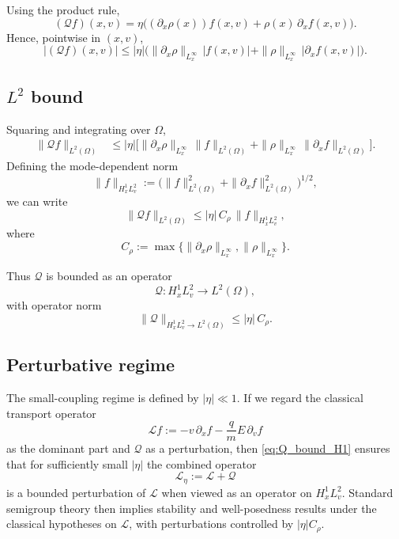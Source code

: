 \documentclass[11pt]{article}
\begin{document}
Using the product rule,
\begin{equation}
  (\mathcal{Q} f)(x,v)
  = \eta \big( (\partial_x \rho(x)) f(x,v)
              + \rho(x)\,\partial_x f(x,v)\big).
  \label{eq:Q_operator}
\end{equation}
Hence, pointwise in $(x,v)$,
\[
  |(\mathcal{Q} f)(x,v)|
  \le |\eta|\Big( \|\partial_x \rho\|_{L^\infty_x}\,|f(x,v)|
                  + \|\rho\|_{L^\infty_x}
                    \,|\partial_x f(x,v)|\Big).
\]

\subsection{$L^2$ bound}

Squaring and integrating over $\Omega$,
\begin{align*}
  \|\mathcal{Q} f\|_{L^2(\Omega)}
  &\le |\eta| \Big[
    \|\partial_x \rho\|_{L^\infty_x}\,\|f\|_{L^2(\Omega)}
    + \|\rho\|_{L^\infty_x}\,\|\partial_x f\|_{L^2(\Omega)}
  \Big].
\end{align*}
Defining the mode-dependent norm
\[
  \|f\|_{H^1_x L^2_v}
  := \big( \|f\|_{L^2(\Omega)}^2
          + \|\partial_x f\|_{L^2(\Omega)}^2 \big)^{1/2},
\]
we can write
\begin{equation}
  \|\mathcal{Q} f\|_{L^2(\Omega)}
  \le |\eta|\,C_\rho\,\|f\|_{H^1_x L^2_v},
  \label{eq:Q_bound_H1}
\end{equation}
where
\[
  C_\rho := \max\{\|\partial_x \rho\|_{L^\infty_x}, \|\rho\|_{L^\infty_x}\}.
\]

Thus $\mathcal{Q}$ is bounded as an operator
\[
  \mathcal{Q}: H^1_x L^2_v \to L^2(\Omega),
\]
with operator norm
\[
  \|\mathcal{Q}\|_{H^1_x L^2_v \to L^2(\Omega)}
  \le |\eta|\,C_\rho.
\]

\subsection{Perturbative regime}

The small-coupling regime is defined by $|\eta|\ll 1$. If we regard the
classical transport operator
\[
  \mathcal{L} f := - v\,\partial_x f - \frac{q}{m} E\,\partial_v f
\]
as the dominant part and $\mathcal{Q}$ as a perturbation, then
\eqref{eq:Q_bound_H1} ensures that for sufficiently small $|\eta|$ the
combined operator
\[
  \mathcal{L}_\eta := \mathcal{L} + \mathcal{Q}
\]
is a bounded perturbation of $\mathcal{L}$ when viewed as an operator on
$H^1_x L^2_v$. Standard semigroup theory then implies stability and
well-posedness results under the classical hypotheses on $\mathcal{L}$,
with perturbations controlled by $|\eta| C_\rho$.
\end{document}
